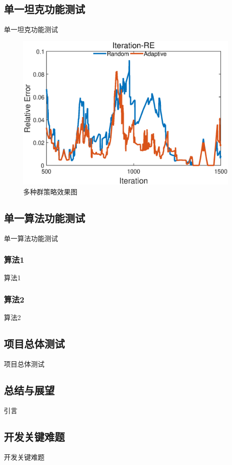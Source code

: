 \documentclass[twoside]{CUGThesis}
\begin{document}
	\subsection{单一坦克功能测试}
	单一坦克功能测试
	\begin{figure}[!t]
		\centering
		\includegraphics[scale=0.35]{Figures/1}
		\caption{多种群策略效果图}
		\label{Fig:multiPop}
	\end{figure}
	\subsection{单一算法功能测试}
	单一算法功能测试
		\subsubsection{算法1}
		算法1
		\subsubsection{算法2}
		算法2
	\subsection{项目总体测试}
	项目总体测试

\begin{spacing}{2}
	\section{总结与展望}
\end{spacing}
引言
	\subsection{开发关键难题}
	开发关键难题
\end{document}

